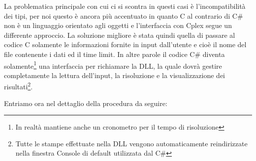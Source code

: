 \documentclass[11pt]{article}
\begin{document}
La problematica principale con cui ci si scontra in questi casi è l'incompatibilità dei tipi, per noi questo è ancora più accentuato in quanto C al contrario di C\# non è un linguaggio orientato agli oggetti e l'interfaccia con Cplex segue un differente approccio. La soluzione migliore è stata quindi quella di passare al codice C solamente le informazioni fornite in input dall'utente e cioè il nome del file contenente i dati ed il time limit. In altre parole il codice C\# diventa solamente\footnote{In realtà mantiene anche un cronometro per il tempo di risoluzione} una interfaccia per richiamare la DLL, la quale dovrà gestire completamente la lettura dell'input, la risoluzione e la visualizzazione dei risultati\footnote{Tutte le stampe effettuate nella DLL vengono automaticamente reindirizzate nella finestra Console di default utilizzata dal C\#}.

Entriamo ora nel dettaglio della procedura da seguire:


\end{document}
